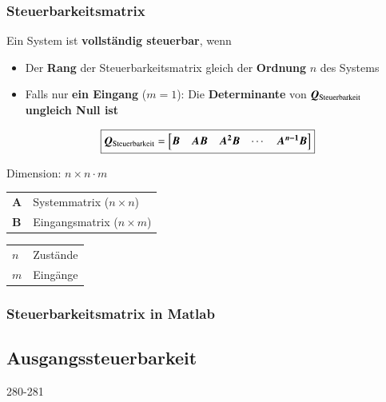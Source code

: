 \subsubsection{Steuerbarkeitsmatrix}

Ein System ist \textbf{vollständig steuerbar}, wenn
\begin{itemize}
    \item Der \textbf{Rang} der Steuerbarkeitsmatrix gleich der \textbf{Ordnung} $n$ des Systems
    \item Falls nur \textbf{ein Eingang} ($m = 1$): Die \textbf{Determinante} von $\bm{Q}_{\rm Steuerbarkeit}$ 
        \textbf{ungleich Null ist}
\end{itemize}

\begin{minipage}[c]{0.6\columnwidth}
    $$ \boxed{ \bm{Q}_{\rm Steuerbarkeit} = 
    \begin{bmatrix}
        \bm{B} & \bm{A B} & \bm{A^2 B} & \cdots & \bm{A^{n-1} B} 
    \end{bmatrix} } $$
\end{minipage}
\hfill
\begin{minipage}[c]{0.38\columnwidth}
    Dimension: $n \times n \cdot m$
\end{minipage}


\begin{minipage}[c]{0.48\columnwidth}
    \begin{tabular}{ll}
        $\bm{A}$    & Systemmatrix ($n \times n$) \\
        $\bm{B}$    & Eingangsmatrix ($n \times m$) \\
    \end{tabular}
\end{minipage}
\hfill
\begin{minipage}[c]{0.48\columnwidth}
    \begin{tabular}{ll}
        $n$         & Zustände \\
        $m$         & Eingänge \\
    \end{tabular}
\end{minipage}


\subsubsection*{Steuerbarkeitsmatrix in Matlab}



\subsection{Ausgangssteuerbarkeit}{280-281}


